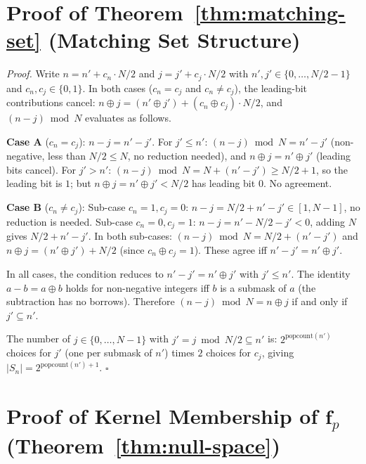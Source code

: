 \documentclass[11pt]{article}
\begin{document}



\newpage

\setcounter{theorem}{0}
\appendix

\section{Proof of Theorem~\ref{thm:matching-set} (Matching Set Structure)}
\label{app:matching-set-proof}

\noindent\textit{Proof.} Write $n = n' + c_n \cdot N/2$ and $j = j' + c_j \cdot N/2$ with $n', j' \in \{0,\ldots,N/2-1\}$ and $c_n, c_j \in \{0,1\}$. In both cases ($c_n = c_j$ and $c_n \neq c_j$), the leading-bit contributions cancel: $n \oplus j = (n' \oplus j') + (c_n \oplus c_j)\cdot N/2$, and $(n-j)\bmod N$ evaluates as follows.

\medskip
\noindent\textbf{Case A} ($c_n = c_j$): $n - j = n' - j'$. For $j' \leq n'$: $(n-j)\bmod N = n'-j'$ (non-negative, less than $N/2 \leq N$, no reduction needed), and $n \oplus j = n' \oplus j'$ (leading bits cancel). For $j' > n'$: $(n-j)\bmod N = N + (n'-j') \geq N/2+1$, so the leading bit is $1$; but $n \oplus j = n' \oplus j' < N/2$ has leading bit $0$. No agreement.

\medskip
\noindent\textbf{Case B} ($c_n \neq c_j$): Sub-case $c_n=1, c_j=0$: $n-j = N/2 + n' - j' \in [1,N-1]$, no reduction is needed. Sub-case $c_n=0, c_j=1$: $n-j = n' - N/2 - j' < 0$, adding $N$ gives $N/2 + n' - j'$. In both sub-cases: $(n-j)\bmod N = N/2 + (n'-j')$ and $n \oplus j = (n' \oplus j') + N/2$ (since $c_n \oplus c_j = 1$). These agree iff $n'-j' = n' \oplus j'$.

\medskip
In all cases, the condition reduces to $n' - j' = n' \oplus j'$ with $j' \leq n'$. The identity $a - b = a \oplus b$ holds for non-negative integers iff $b$ is a submask of $a$ (the subtraction has no borrows). Therefore $(n-j)\bmod N = n \oplus j$ if and only if $j' \subseteq n'$.

The number of $j \in \{0,\ldots,N-1\}$ with $j' = j \bmod N/2 \subseteq n'$ is: $2^{\mathrm{popcount}(n')}$ choices for $j'$ (one per submask of $n'$) times $2$ choices for $c_j$, giving $|S_n| = 2^{\mathrm{popcount}(n')+1}$. $\square$

\section{Proof of Kernel Membership of $\mathbf{f}_p$ (Theorem~\ref{thm:null-space})}
\label{app:fp-kernel-proof}
\end{document}
